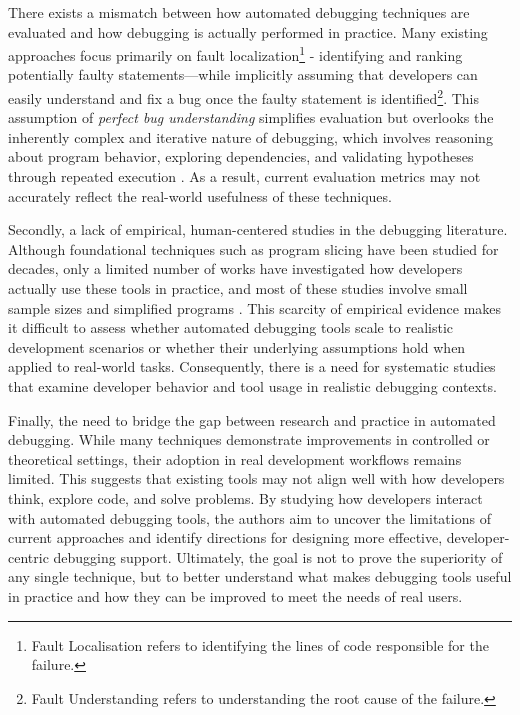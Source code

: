 There exists a mismatch between how automated debugging techniques are evaluated and how debugging is actually performed in practice. Many existing approaches focus primarily on fault localization\footnote{Fault Localisation refers to identifying the lines of code responsible for the failure.} - identifying and ranking potentially faulty statements—while implicitly assuming that developers can easily understand and fix a bug once the faulty statement is identified\footnote{Fault Understanding refers to understanding the root cause of the failure.}. This assumption of \textit{perfect bug understanding} simplifies evaluation but overlooks the inherently complex and iterative nature of debugging, which involves reasoning about program behavior, exploring dependencies, and validating hypotheses through repeated execution \cite{Weiser1981}. As a result, current evaluation metrics may not accurately reflect the real-world usefulness of these techniques.

Secondly, a lack of empirical, human-centered studies in the debugging literature. Although foundational techniques such as program slicing have been studied for decades, only a limited number of works have investigated how developers actually use these tools in practice, and most of these studies involve small sample sizes and simplified programs \cite{Francel2001,Weiser1986}. This scarcity of empirical evidence makes it difficult to assess whether automated debugging tools scale to realistic development scenarios or whether their underlying assumptions hold when applied to real-world tasks. Consequently, there is a need for systematic studies that examine developer behavior and tool usage in realistic debugging contexts.

Finally, the need to bridge the gap between research and practice in automated debugging. While many techniques demonstrate improvements in controlled or theoretical settings, their adoption in real development workflows remains limited. This suggests that existing tools may not align well with how developers think, explore code, and solve problems. By studying how developers interact with automated debugging tools, the authors aim to uncover the limitations of current approaches and identify directions for designing more effective, developer-centric debugging support. Ultimately, the goal is not to prove the superiority of any single technique, but to better understand what makes debugging tools useful in practice and how they can be improved to meet the needs of real users.

